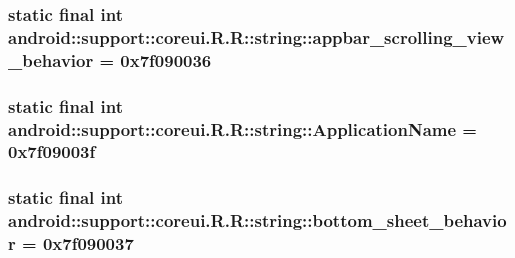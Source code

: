 \hypertarget{classandroid_1_1support_1_1coreui_1_1_r_1_1string_2c3b63a8720f44d8c17b9a39b44fcfab}{
\subsubsection[{appbar\_\-scrolling\_\-view\_\-behavior}]{\setlength{\rightskip}{0pt plus 5cm}static final int android::support::coreui.R.R::string::appbar\_\-scrolling\_\-view\_\-behavior = 0x7f090036}}
\label{classandroid_1_1support_1_1coreui_1_1_r_1_1string_2c3b63a8720f44d8c17b9a39b44fcfab}


\hypertarget{classandroid_1_1support_1_1coreui_1_1_r_1_1string_73b765b0808e9c5b620092d817f20ee8}{
\subsubsection[{ApplicationName}]{\setlength{\rightskip}{0pt plus 5cm}static final int android::support::coreui.R.R::string::ApplicationName = 0x7f09003f}}
\label{classandroid_1_1support_1_1coreui_1_1_r_1_1string_73b765b0808e9c5b620092d817f20ee8}


\hypertarget{classandroid_1_1support_1_1coreui_1_1_r_1_1string_f139a58c9821cd421d8f10f62ed0547e}{
\subsubsection[{bottom\_\-sheet\_\-behavior}]{\setlength{\rightskip}{0pt plus 5cm}static final int android::support::coreui.R.R::string::bottom\_\-sheet\_\-behavior = 0x7f090037}}
\label{classandroid_1_1support_1_1coreui_1_1_r_1_1string_f139a58c9821cd421d8f10f62ed0547e}


